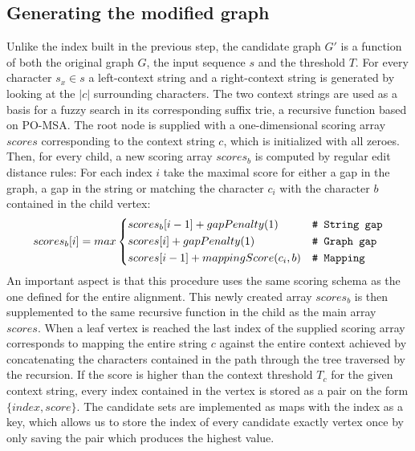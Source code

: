 \documentclass[thesis.tex]{subfiles}
\begin{document}
\subsection{Generating the modified graph}
Unlike the index built in the previous step, the candidate graph $G'$ is a function of both the original graph $G$, the input sequence $s$ and the threshold $T$. For every character $s_x \in s$ a left-context string and a right-context string is generated by looking at the $|c|$ surrounding characters. The two context strings are used as a basis for a fuzzy search in its corresponding suffix trie, a recursive function based on PO-MSA. The root node is supplied with a one-dimensional scoring array $scores$ corresponding to the context string $c$, which is initialized with all zeroes. Then, for every child, a new scoring array $scores_b$ is computed by regular edit distance rules: For each index $i$ take the maximal score for either a gap in the graph, a gap in the string or matching the character $c_i$ with the character $b$ contained in the child vertex:
\begin{equation}
  scores_b[i] = max \begin{dcases}
    scores_b[i - 1] + gapPenalty(1) & \text{\texttt{\# String gap}}\\
    scores[i] + gapPenalty(1) & \text{\texttt{\# Graph gap}}\\
    scores[i - 1] + mappingScore(c_i, b) & \text{\texttt{\# Mapping}}\\
  \end{dcases}
\end{equation} 
An important aspect is that this procedure uses the same scoring schema as the one defined for the entire alignment. This newly created array $scores_b$ is then supplemented to the same recursive function in the child as the main array $scores$. When a leaf vertex is reached the last index of the supplied scoring array corresponds to mapping the entire string $c$ against the entire context achieved by concatenating the characters contained in the path through the tree traversed by the recursion. If the score is higher than the context threshold $T_c$ for the given context string, every index contained in the vertex is stored as a pair on the form $\{index, score\}$. The candidate sets are implemented as maps with the index as a key, which allows us to store the index of every candidate exactly vertex once by only saving the pair which produces the highest value.\\
\par\noindent
\end{document}
